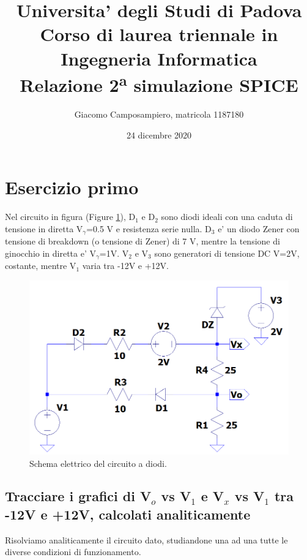 \documentclass[a4paper,10pt]{article}
\begin{document}
%

   
   \title{{\large Universita' degli Studi di Padova \\ } {\normalsize Corso di laurea triennale in Ingegneria Informatica}\\ \vspace{1.8cm} \textbf{ Relazione 2\textsuperscript{a} simulazione SPICE}}

   \author{Giacomo Camposampiero, matricola 1187180}
          
   \date{24 dicembre 2020}

   \maketitle
   
   \newpage
   
   \renewcommand{\contentsname}{Indice}      
   \tableofcontents
   
   \newpage
  
\section{Esercizio primo}
Nel circuito in figura (Figure \ref{fig:ckt1}), D$_1$ e D$_2$ sono diodi ideali con una caduta di tensione in diretta V$_\gamma$=0.5 V e resistenza serie nulla. D$_3$ e' un diodo Zener con tensione di breakdown (o tensione di Zener) di 7 V, mentre la tensione di ginocchio in diretta e' V$_\gamma$=1V. V$_2$ e V$_3$ sono generatori di tensione DC V=2V, costante, mentre V$_1$ varia tra -12V e +12V.
\begin{figure}[h!]
  	\centering
 	\includegraphics[width=0.6\linewidth]{ckt1.png}
  	\caption{Schema elettrico del circuito a diodi.}
  	\label{fig:ckt1}
\end{figure}

\subsection{Tracciare i grafici di V$_o$ vs V$_1$ e V$_x$ vs V$_1$ tra -12V e +12V, calcolati analiticamente}
Risolviamo analiticamente il circuito dato, studiandone una ad una tutte le diverse condizioni di funzionamento. 
\end{document}
